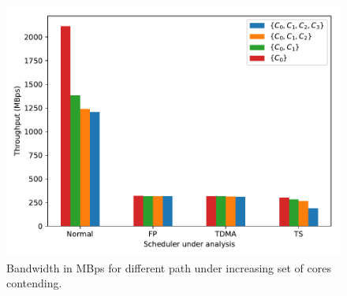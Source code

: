 \begin{figure}
  \centering
  \includegraphics[scale=0.5]{images/bw_comparisons.pdf}
  \caption{Bandwidth in MBps for different path under increasing set of cores contending.}
  \label{fig:bandwidth_comparison}
\end{figure}


